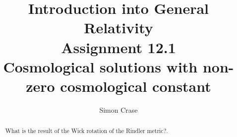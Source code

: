 \documentclass[]{article}
\title{Introduction into General Relativity\\Assignment 12.1\\Cosmological solutions with non-zero cosmological constant}
\author{Simon Crase}
\begin{document}
\maketitle

\begin{abstract}
What is the result of the Wick rotation of the Rindler metric?.
\end{abstract}

\section{}
\end{document}
